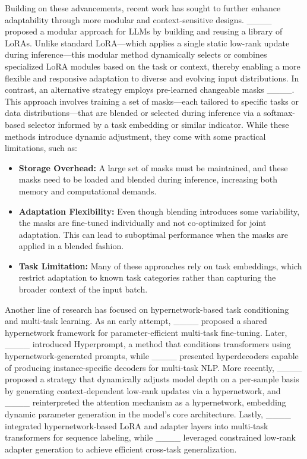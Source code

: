 Building on these advancements, recent work has sought to further enhance adaptability through more modular and context-sensitive designs. ____ proposed a modular approach for LLMs by building and reusing a library of LoRAs. Unlike standard LoRA—which applies a single static low-rank update during inference—this modular method dynamically selects or combines specialized LoRA modules based on the task or context, thereby enabling a more flexible and responsive adaptation to diverse and evolving input distributions. In contrast, an alternative strategy employs pre-learned changeable masks ____. This approach involves training a set of masks—each tailored to specific tasks or data distributions—that are blended or selected during inference via a softmax-based selector informed by a task embedding or similar indicator. While these methods introduce dynamic adjustment, they come with some practical limitations, such as:
\begin{itemize}
    \item \textbf{Storage Overhead:} A large set of masks must be maintained, and these masks need to be loaded and blended during inference, increasing both memory and computational demands.
    \item \textbf{Adaptation Flexibility:} Even though blending introduces some variability, the masks are fine-tuned individually and not co-optimized for joint adaptation. This can lead to suboptimal performance when the masks are applied in a blended fashion.
    \item \textbf{Task Limitation:} Many of these approaches rely on task embeddings, which restrict adaptation to known task categories rather than capturing the broader context of the input batch.
\end{itemize}

Another line of research has focused on hypernetwork-based task conditioning and multi-task learning. As an early attempt, ____ proposed a shared hypernetwork framework for parameter‑efficient multi‑task fine‑tuning. Later, ____ introduced Hyperprompt, a method that conditions transformers using hypernetwork‑generated prompts, while ____ presented hyperdecoders capable of producing instance‑specific decoders for multi‑task NLP. More recently, ____ proposed a strategy that dynamically adjusts model depth on a per‑sample basis by generating context‑dependent low‑rank updates via a hypernetwork, and ____ reinterpreted the attention mechanism as a hypernetwork, embedding dynamic parameter generation in the model’s core architecture. Lastly, ____ integrated hypernetwork‑based LoRA and adapter layers into multi‑task transformers for sequence labeling, while ____ leveraged constrained low‑rank adapter generation to achieve efficient cross‑task generalization.



